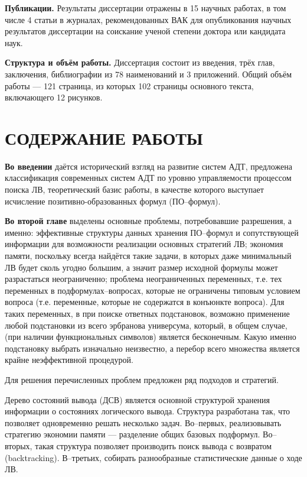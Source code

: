 \documentclass[a4paper]{report}
\begin{document}
\textbf{Публикации.} Результаты диссертации отражены в 15 научных работах, в том числе 4 статьи в журналах, рекомендованных ВАК для опубликования научных результатов диссертации на соискание ученой степени доктора или кандидата наук.

\textbf{Структура и объём работы.} Диссертация состоит из введения, трёх глав, заключения, библиографии из 78 наименований и 3 приложений. Общий объём работы --- 121 страница, из которых 102 страницы основного текста, включающего 12 рисунков.


\section*{СОДЕРЖАНИЕ РАБОТЫ}

\textbf{Во введении} даётся исторический взгляд на развитие систем АДТ, предложена классификация современных систем АДТ по уровню управляемости процессом поиска ЛВ, теоретический базис работы, в качестве которого выступает исчисление позитивно-образованных формул (ПО--формул).


\textbf{Во второй главе} выделены основные проблемы, потребовавшие разрешения, а именно: эффективные структуры данных хранения ПО--формул и сопутствующей информации для возможности реализации основных стратегий ЛВ; экономия памяти, поскольку всегда найдётся такие задачи, в которых даже минимальный ЛВ будет сколь угодно большим, а значит размер исходной формулы может разрастаться неограниченно; проблема неограниченных переменных, т.е. тех переменных в подформулах--вопросах, которые не ограничены типовым условием вопроса (т.е. переменные, которые не содержатся в конъюнкте вопроса). Для таких переменных, в при поиске ответных подстановок, возможно применение любой подстановки из всего эрбранова универсума, который, в общем случае, (при наличии функциональных символов) является бесконечным. Какую именно подстановку выбрать изначально неизвестно, а перебор всего множества является крайне неэффективной процедурой.

Для решения перечисленных проблем предложен ряд подходов и стратегий.

Дерево состояний вывода (ДСВ) является основной структурой хранения информации о состояниях логического вывода. Структура разработана так, что позволяет одновременно решать несколько задач. Во--первых, реализовывать стратегию экономии памяти --- разделение общих базовых подформул. Во--вторых, такая структура позволяет производить поиск вывода с возвратом (backtracking). В--третьих, собирать разнообразные статистические данные о ходе ЛВ.
\end{document}
